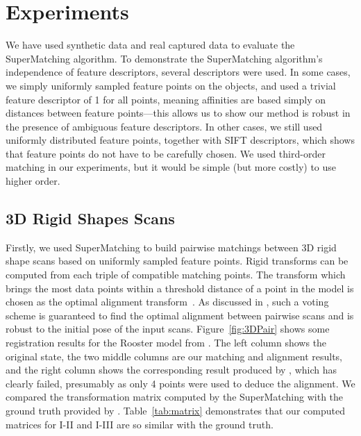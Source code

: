 \section{Experiments}
\label{sec:experiments}

We have used synthetic data and real captured data to evaluate the SuperMatching algorithm.
To demonstrate  the SuperMatching algorithm's independence of feature descriptors, several descriptors were used.
In some cases, we simply uniformly sampled feature points on the objects, and used a trivial feature descriptor of 1 for all points, meaning affinities are based simply on distances between feature points---this allows us to show our method is robust in the presence of ambiguous feature descriptors.
In other cases, we still used uniformly distributed feature points, together with SIFT descriptors, which shows that feature points do not have to be carefully chosen.
We used third-order matching in our experiments, but it would be simple (but more costly) to use higher order.

\subsection{3D Rigid Shapes Scans}
\label{subsec:3DRigid}

Firstly, we used SuperMatching to build pairwise matchings between 3D rigid shape scans based on uniformly sampled feature points.
Rigid transforms can be computed from each triple of compatible matching points.
The transform which brings the most data points within a threshold distance of a point in the model is chosen as the optimal alignment transform~\cite{Huttenlocher90}.
As discussed in \cite{Gelfand05}, such a voting scheme is guaranteed to find the optimal alignment between pairwise scans and is robust to the initial pose of the input scans.
Figure~\ref{fig:3DPair} shows some registration results for the Rooster model from \cite{Chuang09}. The left column shows the original state,
the two middle columns are our matching and alignment results, and
the right column shows the corresponding result produced by \cite{Aiger08}, which has clearly failed, presumably as only 4 points were used to deduce the alignment.
We compared the transformation matrix computed by the SuperMatching with the ground truth provided by \cite{Chuang09}.
Table~\ref{tab:matrix} demonstrates that our computed matrices for I-II and I-III are so similar with the ground truth. 

